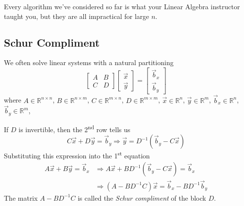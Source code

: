 Every algorithm we've considered so far is what your Linear Algebra instructor
taught you, but they are all impractical for large $n$.

\subsection{Schur Compliment}
We often solve linear systems with a natural partitioning
%
\begin{equation*}
  \begin{bmatrix}
    A & B \\
    C & D
  \end{bmatrix}
  \begin{bmatrix}
    \Vec{x} \\
    \Vec{y}
  \end{bmatrix}
  = 
  \begin{bmatrix}
    \Vec{b}_x \\
    \Vec{b}_y
  \end{bmatrix}
\end{equation*}
%
where
$A\in\mathbb{R}^{n\times n}$,
$B\in\mathbb{R}^{n\times m}$,
$C\in\mathbb{R}^{m\times n}$,
$D\in\mathbb{R}^{m\times m}$, 
$\Vec{x}\in\mathbb{R}^n$,
$\Vec{y}\in\mathbb{R}^m$,
$\Vec{b}_x\in\mathbb{R}^n$,
$\Vec{b}_y\in\mathbb{R}^m$,

If $D$ is invertible, then the 2\textsuperscript{nd} row tells us
%
\begin{equation*}
C\Vec{x} + D \Vec{y} = \Vec{b}_y \Rightarrow \Vec{y} = D^{-1} (\vec{b}_y - C\Vec{x})
\end{equation*}
%
Substituting this expression into the 1\textsuperscript{st} equation
\begin{align*}
  A\Vec{x} + B \Vec{y} = \Vec{b}_x &\Rightarrow A\Vec{x} + BD^{-1} (\vec{b}_y - C\Vec{x}) = \Vec{b}_x\\
  &\Rightarrow (A-BD^{-1}C) \Vec{x} = \Vec{b}_x -BD^{-1} \Vec{b}_y
\end{align*}
%
The matrix $A-BD^{-1}C$ is called the \emph{Schur compliment} of the block $D$.

